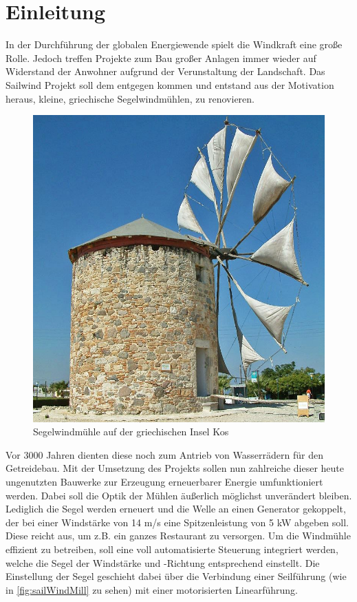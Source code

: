 \section{Einleitung}
In der Durchführung der globalen Energiewende spielt die Windkraft eine große Rolle. Jedoch treffen Projekte zum Bau großer Anlagen immer wieder auf Widerstand der Anwohner aufgrund der Verunstaltung der Landschaft. Das Sailwind Projekt soll dem entgegen kommen und entstand aus der Motivation heraus, kleine, griechische Segelwindmühlen, zu renovieren. 
\begin{figure}[H]
	\centering
	\includegraphics[width=0.6\linewidth]{images/Sailwind/greekSailWindMill.jpg}
	\caption[Segelwindmühle auf der griechischen Insel Kos]{Segelwindmühle auf der griechischen Insel Kos \protect\cite{windMill}}
	\label{fig:sailWindMill}
\end{figure}
\noindent
Vor 3000 Jahren dienten diese noch zum Antrieb von Wasserrädern für den Getreidebau. Mit der Umsetzung des Projekts sollen nun zahlreiche dieser heute ungenutzten Bauwerke zur Erzeugung erneuerbarer Energie umfunktioniert werden. Dabei soll die Optik der Mühlen äußerlich möglichst unverändert bleiben. Lediglich die Segel werden erneuert und die Welle an einen Generator gekoppelt, der bei einer Windstärke von 14 m/s eine Spitzenleistung von 5 kW abgeben soll. Diese reicht aus, um z.B. ein ganzes Restaurant zu versorgen. \cite{industrProjektSailwind} Um die Windmühle effizient zu betreiben, soll eine voll automatisierte Steuerung integriert werden, welche die Segel der Windstärke und -Richtung entsprechend einstellt. Die Einstellung der Segel geschieht dabei über die Verbindung einer Seilführung (wie in \autoref{fig:sailWindMill} zu sehen) mit einer motorisierten Linearführung.
